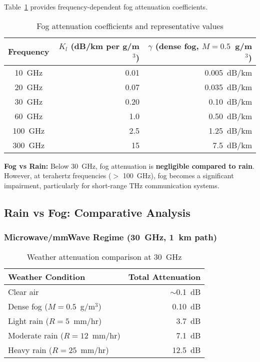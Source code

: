 Table~\ref{tab:fog-coeffs} provides frequency-dependent fog attenuation coefficients.

\begin{table}[h!]
\centering
\caption{Fog attenuation coefficients and representative values}
\label{tab:fog-coeffs}
\begin{tabular}{@{}crr@{}}
\toprule
Frequency & $K_l$ (dB/km per g/m$^3$) & $\gamma$ (dense fog, $M = 0.5$~g/m$^3$) \\
\midrule
10~GHz & 0.01 & 0.005~dB/km \\
20~GHz & 0.07 & 0.035~dB/km \\
30~GHz & 0.20 & 0.10~dB/km \\
60~GHz & 1.0 & 0.50~dB/km \\
100~GHz & 2.5 & 1.25~dB/km \\
300~GHz & 15 & 7.5~dB/km \\
\bottomrule
\end{tabular}
\end{table}

\begin{keyconcept}
\textbf{Fog vs Rain:} Below 30~GHz, fog attenuation is \textbf{negligible compared to rain}. However, at terahertz frequencies ($>$ 100~GHz), fog becomes a significant impairment, particularly for short-range THz communication systems.
\end{keyconcept}

\subsection{Rain vs Fog: Comparative Analysis}

\subsubsection{Microwave/mmWave Regime (30~GHz, 1~km path)}

\begin{table}[h!]
\centering
\caption{Weather attenuation comparison at 30~GHz}
\label{tab:rain-fog-30ghz}
\begin{tabular}{@{}lr@{}}
\toprule
Weather Condition & Total Attenuation \\
\midrule
Clear air & $\sim$0.1~dB \\
Dense fog ($M = 0.5$~g/m$^3$) & 0.10~dB \\
Light rain ($R = 5$~mm/hr) & 3.7~dB \\
Moderate rain ($R = 12$~mm/hr) & 7.1~dB \\
Heavy rain ($R = 25$~mm/hr) & 12.5~dB \\
\bottomrule
\end{tabular}
\end{table}

